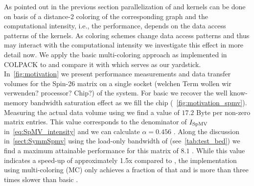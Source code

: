
As pointed out in the previous section parallelization of \SymmSpmv and \KACZ kernels can be done on basis of a distance-2 coloring of the corresponding graph and the computational intensity, i.e., the performance, depends on the data access patterns of the kernels. As coloring schemes change data access patterns and thus may interact with the computational intensity we investigate this effect in more detail now. We apply  the basic multi-coloring approach as implemented in COLPACK \cite{COLPACK} to \SymmSpmv and compare it with \SpMV which serves as our yardstick. In~\cref{fig:motivation} we present performance measurements and data transfer volumes for the Spin-26 matrix on a single socket ({\GW welchen Term wollen wir verwenden? processor? Chip?}) of the \IVB system. For basic \SpMV we recover the well know-memory bandwidth saturation effect as we fill the chip (~\cref{fig:motivation_spmv}). Measuring the actual data volume using \LIKWID we find a value of $17.2$ Byte per non-zero matrix entries. This value corresponds to the denominator of $I_\mathrm{SpMV}$ in~\cref{eq:SpMV_intensity} and we can calculate $\alpha=0.456$ . Along the discussion in~\cref{sect:SymmSpmv} using the load-only bandwidth of \IVB (see~\cref{tab:test_bed}) we find a maximum attainable performance for this matrix of $8.1$ \GF. While this value indicates a speed-up of approximately 1.5x compared to \SpMV, the \SymmSpmv implementation using multi-coloring (MC) only achieves a fraction of that and is more than three times slower than basic \SpMV. 



